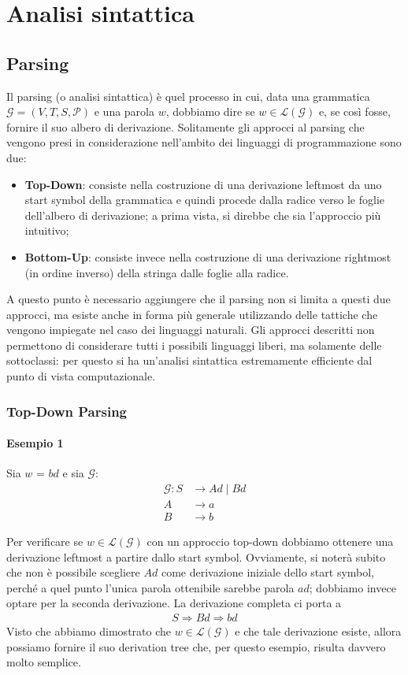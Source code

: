 \documentclass[class=book, crop=false, oneside, 12pt]{standalone}
\begin{document}
\chapter{Analisi sintattica}

\section{Parsing}
Il parsing (o analisi sintattica) è quel processo in cui, data una grammatica \(\mathcal{G} = (V, T, S, \mathcal{P})\) e una parola \(w\), dobbiamo dire se \(w \in \mathcal{L(G)}\) e, se così fosse, fornire il suo albero di derivazione. Solitamente gli approcci al parsing che vengono presi in considerazione nell'ambito dei linguaggi di programmazione sono due: 
\begin{itemize}
    \item \textbf{Top-Down}: consiste nella costruzione di una derivazione leftmost da uno start symbol della grammatica e quindi procede dalla radice verso le foglie dell'albero di derivazione; a prima vista, si direbbe che sia l'approccio più intuitivo;
    \item \textbf{Bottom-Up}: consiste invece nella costruzione di una derivazione rightmost (in ordine inverso) della stringa dalle foglie alla radice.
\end{itemize}
A questo punto è necessario aggiungere che il parsing non si limita a questi due approcci, ma esiste anche in forma più generale utilizzando delle tattiche che vengono impiegate nel caso dei linguaggi naturali. Gli approcci descritti non permettono di considerare tutti i possibili linguaggi liberi, ma solamente delle sottoclassi: per questo si ha un'analisi sintattica estremamente efficiente dal punto di vista computazionale.

\subsection{Top-Down Parsing}
\subsubsection{Esempio 1}
Sia \(w\) = \(bd\) e sia \(\mathcal{G}\): 
\begin{align*}
    \mathcal{G}: S &\rightarrow Ad \mid Bd \\
    A &\rightarrow a \\
    B &\rightarrow b
\end{align*}

Per verificare se \(w \in \mathcal{L(G)}\) con un approccio top-down dobbiamo ottenere una derivazione leftmost a partire dallo start symbol. Ovviamente, si noterà subito che non è possibile scegliere \(Ad\) come derivazione iniziale dello start symbol, perché a quel punto l'unica parola ottenibile sarebbe parola \(ad\); dobbiamo invece optare per la seconda derivazione. La derivazione completa ci porta a
\begin{align*}
    S \Rightarrow Bd \Rightarrow bd
\end{align*}
Visto che abbiamo dimostrato che \(w \in \mathcal{L(G)}\) e che tale derivazione esiste, allora possiamo fornire il suo derivation tree che, per questo esempio, risulta davvero molto semplice.
\end{document}
